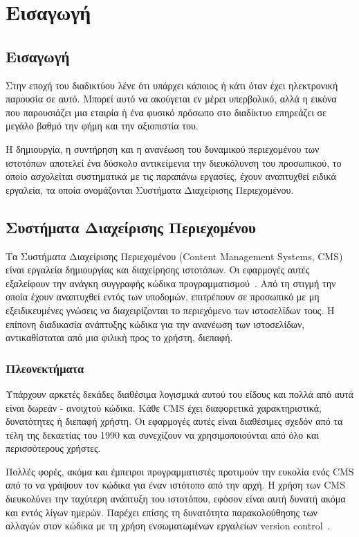 \documentclass[12pt]{report}
\begin{document}
\hypersetup{pageanchor=true}
\clearpage
{}

\chapter{Εισαγωγή}\label{ch1}
\section{Εισαγωγή}
Στην εποχή του διαδικτύου λένε ότι υπάρχει κάποιος ή κάτι όταν έχει ηλεκτρονική παρουσία σε αυτό. Μπορεί αυτό να ακούγεται εν μέρει υπερβολικό, αλλά η εικόνα που παρουσιάζει μια εταιρία ή ένα φυσικό πρόσωπο στο διαδίκτυο επηρεάζει σε μεγάλο βαθμό την φήμη και την αξιοπιστία του.

Η δημιουργία, η συντήρηση και η ανανέωση του δυναμικού περιεχομένου των ιστοτόπων αποτελεί ένα δύσκολο αντικείμενια την διευκόλυνση του προσωπικού, το οποίο ασχολείται συστηματικά με τις παραπάνω εργασίες, έχουν αναπτυχθεί ειδικά εργαλεία, τα οποία ονομάζονται Συστήματα Διαχείρισης Περιεχομένου.

\section{Συστήματα Διαχείρισης Περιεχομένου}
Τα Συστήματα Διαχείρισης Περιεχομένου (\textlatin{Content Management Systems, CMS}) είναι εργαλεία δημιουργίας και διαχείρησης ιστοτόπων. Οι εφαρμογές αυτές εξαλείφουν την ανάγκη συγγραφής κώδικα προγραμματισμού~\cite{linode}. Από τη στιγμή την οποία έχουν αναπτυχθεί εντός των υποδομών, επιτρέπουν σε προσωπικό με μη εξειδικευμένες γνώσεις να διαχειρίζονται το περιεχόμενο των ιστοσελίδων τους.
Η επίπονη διαδικασία ανάπτυξης κώδικα για την ανανέωση των ιστοσελίδων, αντικαθίσταται από μια φιλική προς το χρήστη, διεπαφή.

\subsection{Πλεονεκτήματα}
Υπάρχουν αρκετές δεκάδες διαθέσιμα λογισμικά αυτού του είδους και πολλά από αυτά είναι δωρεάν - ανοιχτού κώδικα. Κάθε \textlatin{CMS} έχει διαφορετικά χαρακτηριστικά, δυνατότητες ή διεπαφή χρήστη. Οι εφαρμογές αυτές είναι διαθέσιμες σχεδόν από τα τέλη της δεκαετίας του 1990 και συνεχίζουν να χρησιμοποιούνται από όλο και περισσότερους χρήστες.

Πολλές φορές, ακόμα και έμπειροι προγραμματιστές προτιμούν την ευκολία ενός \textlatin{CMS} από το να γράψουν τον κώδικα για έναν ιστότοπο από την αρχή. Η χρήση των \textlatin{CMS} διευκολύνει την ταχύτερη ανάπτυξη του ιστοτόπου, εφόσον είναι αυτή δυνατή ακόμα και εντός λίγων ημερών. Παρέχει επίσης τη δυνατότητα παρακολούθησης των αλλαγών στον κώδικα με τη χρήση ενσωματωμένων εργαλείων \textlatin{version control}~\cite{wikipedia_2017:02}.
\end{document}
